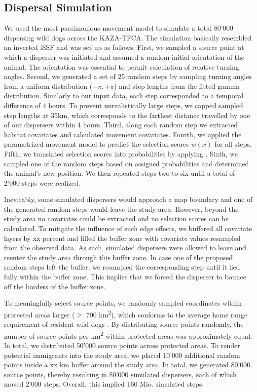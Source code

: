 \documentclass[abstract=on,10pt,a4paper,bibliography=totocnumbered]{article}
\begin{document}
\subsection{Dispersal Simulation}
We used the most parsimonious movement model to simulate a total 80'000
dispersing wild dogs across the KAZA-TFCA. The simulation basically resembled an
inverted iSSF and was set up as follows. First, we sampled a source point at
which a disperser was initiated and assumed a random initial orientation of the
animal. The orientation was essential to permit calculation of relative turning
angles. Second, we generated a set of 25 random steps by sampling turning angles
from a uniform distribution (\(-\pi, +\pi\)) and step lengths from the fitted
gamma distribution. Similarly to our input data, each step corresponded to a
temporal difference of 4 hours. To prevent unrealistically large steps, we
capped sampled step lengths at 35km, which corresponds to the farthest distance
travelled by one of our dispersers within 4 hours. Third, along each random step
we extracted habitat covariates and calculated movement covariates. Fourth, we
applied the parametrized movement model to predict the selection scores \(w(x)\)
for all steps. Fifth, we translated selection scores into probabilities by
applying . Sixth, we sampled one of the random steps based on assigned
probabilities and determined the animal's new position. We then repeated steps
two to six until a total of 2'000 steps were realized.

Inevitably, some simulated dispersers would approach a map boundary and one of
the generated random steps would leave the study area. However, beyond the study
area no covariates could be extracted and no selection scores can be calculated.
To mitigate the influence of such edge effects, we buffered all covariate layers
by xx percent and filled the buffer zone with covariate values resampled from
the observed data. As such, simulated dispersers were allowed to leave and
reenter the study area through this buffer zone. In case one of the proposed
random steps left the buffer, we resampled the corresponding step until it lied
fully within the buffer zone. This implies that we forced the disperser to
bounce off the borders of the buffer zone.

To meaningfully select source points, we randomly sampled coordinates within
protected areas larger (\(>\) 700 km\textsuperscript{2}), which conforms to the
average home range requirement of resident wild dogs \citep{Pomilia.2015}. By
distributing source points randomly, the number of source points per
km\textsuperscript{2} within protected areas was approximately equal. In total,
we distributed 50'000 source points across protected areas. To render potential
immigrants into the study area, we placed 10'000 additional random points inside
a xx km buffer around the study area. In total, we generated 80'000 source
points, thereby resulting in 80'000 simulated dispersers, each of which moved
2'000 steps. Overall, this implied 160 Mio. simulated steps.
\end{document}
